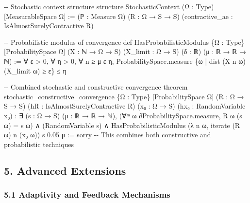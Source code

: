 \documentclass[
]{article}
\newenvironment{Shaded}{}{}
\newcommand{\NormalTok}[1]{#1}
\begin{document}
\begin{Shaded}
\begin{Highlighting}[]
\NormalTok{{-}{-} Stochastic context structure}
\NormalTok{structure StochasticContext (Ω : Type) [MeasurableSpace Ω] :=}
\NormalTok{  (ℙ : Measure Ω)}
\NormalTok{  (R : Ω → S → S)}
\NormalTok{  (contractive\_ae : IsAlmostSurelyContractive R)}

\NormalTok{{-}{-} Probabilistic modulus of convergence}
\NormalTok{def HasProbabilisticModulus \{Ω : Type\} [ProbabilitySpace Ω]}
\NormalTok{  (X : ℕ → Ω → S) (X\_limit : Ω → S) (δ : ℝ) (μ : ℝ → ℝ → ℕ) :=}
\NormalTok{  ∀ ε \textgreater{} 0, ∀ η \textgreater{} 0, ∀ n ≥ μ ε η,}
\NormalTok{    ProbabilitySpace.measure \{ω | dist (X n ω) (X\_limit ω) ≥ ε\} ≤ η}

\NormalTok{{-}{-} Combined stochastic and constructive convergence}
\NormalTok{theorem stochastic\_constructive\_convergence}
\NormalTok{  \{Ω : Type\} [ProbabilitySpace Ω] (R : Ω → S → S)}
\NormalTok{  (hR : IsAlmostSurelyContractive R) (x₀ : Ω → S) (hx₀ : RandomVariable x₀) :}
\NormalTok{  ∃ (s : Ω → S) (μ : ℝ → ℝ → ℕ),}
\NormalTok{    (∀ᵐ ω ∂ProbabilitySpace.measure, R ω (s ω) = s ω) ∧}
\NormalTok{    (RandomVariable s) ∧}
\NormalTok{    HasProbabilisticModulus (λ n ω, iterate (R ω) n (x₀ ω)) s 0.05 μ :=}
\NormalTok{  sorry {-}{-} This combines both constructive and probabilistic techniques}
\end{Highlighting}
\end{Shaded}

\subsection{5. Advanced Extensions}\label{advanced-extensions}

\subsubsection{5.1 Adaptivity and Feedback
Mechanisms}\label{adaptivity-and-feedback-mechanisms}
\end{document}
